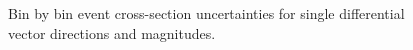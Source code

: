 \documentclass{article}
\begin{document}
\begin{figure}
    \caption{Bin by bin event cross-section uncertainties for single differential vector directions and magnitudes.}
    \label{fig:bin-uncertainties-xsec-vector}
\end{figure}
\end{document}
